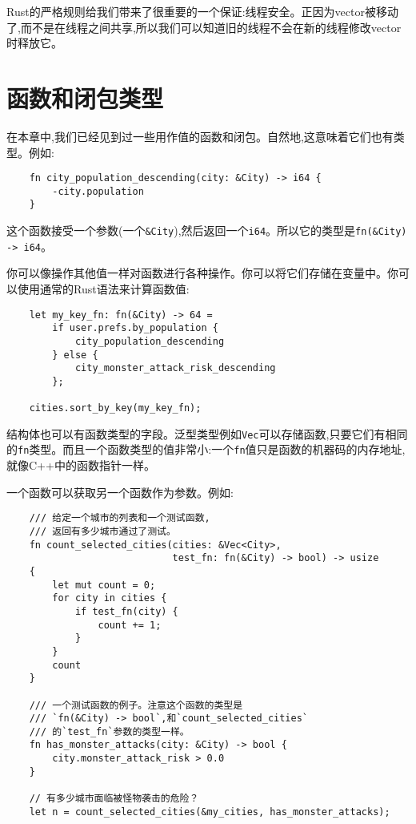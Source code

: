 Rust的严格规则给我们带来了很重要的一个保证:线程安全。正因为vector被移动了,而不是在线程之间共享,所以我们可以知道旧的线程不会在新的线程修改vector时释放它。

\section{函数和闭包类型}\label{fn}

在本章中,我们已经见到过一些用作值的函数和闭包。自然地,这意味着它们也有类型。例如:
\begin{verbatim}
    fn city_population_descending(city: &City) -> i64 {
        -city.population
    }
\end{verbatim}

这个函数接受一个参数(一个\texttt{\&City}),然后返回一个\texttt{i64}。所以它的类型是\texttt{fn(\&City) -> i64}。

你可以像操作其他值一样对函数进行各种操作。你可以将它们存储在变量中。你可以使用通常的Rust语法来计算函数值:
\begin{verbatim}
    let my_key_fn: fn(&City) -> 64 =
        if user.prefs.by_population {
            city_population_descending
        } else {
            city_monster_attack_risk_descending
        };
    
    cities.sort_by_key(my_key_fn);
\end{verbatim}

结构体也可以有函数类型的字段。泛型类型例如\texttt{Vec}可以存储函数,只要它们有相同的\texttt{fn}类型。而且一个函数类型的值非常小:一个\texttt{fn}值只是函数的机器码的内存地址,就像C++中的函数指针一样。

一个函数可以获取另一个函数作为参数。例如:
\begin{verbatim}
    /// 给定一个城市的列表和一个测试函数,
    /// 返回有多少城市通过了测试。
    fn count_selected_cities(cities: &Vec<City>,
                             test_fn: fn(&City) -> bool) -> usize
    {
        let mut count = 0;
        for city in cities {
            if test_fn(city) {
                count += 1;
            }
        }
        count
    }

    /// 一个测试函数的例子。注意这个函数的类型是
    /// `fn(&City) -> bool`,和`count_selected_cities`
    /// 的`test_fn`参数的类型一样。
    fn has_monster_attacks(city: &City) -> bool {
        city.monster_attack_risk > 0.0
    }

    // 有多少城市面临被怪物袭击的危险？
    let n = count_selected_cities(&my_cities, has_monster_attacks);
\end{verbatim}

